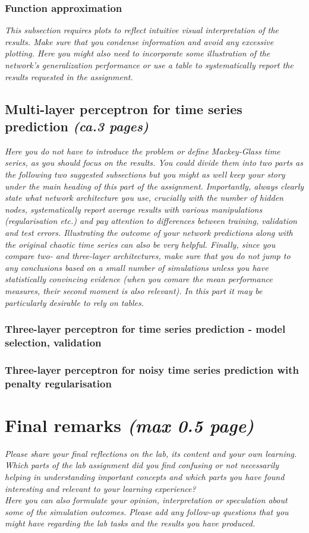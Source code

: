 \documentclass[a4paper]{article}
\begin{document}
\subsubsection{Function approximation}
\textit{This subsection requires plots to reflect intuitive visual interpretation of the results. Make sure that you condense information and avoid any excessive plotting. Here you might also need to incorporate some illustration of the network's generalization performance or use a table to systematically report the results requested in the assignment.}

\subsection{Multi-layer perceptron for time series prediction \textit{(ca.3 pages)}}

\textit{Here you do not have to introduce the problem or define Mackey-Glass time series, as you should focus on the results. You could divide them into two parts as the following two suggested subsections but you might as well keep your story under the main heading of this part of the assignment. Importantly, always clearly state what network architecture you use, crucially with the number of hidden nodes, systematically report average results with various manipulations (regularisation etc.) and pay attention to differences between training, validation and test errors. Illustrating the outcome of your network predictions along with the original chaotic time series can also be very helpful. Finally, since you compare two- and three-layer architectures, make sure that you do not jump to any conclusions based on a small number of simulations unless you have statistically convincing evidence (when you comare the mean performance measures, their second moment is also relevant). In this part it may be particularly desirable to rely on tables.}

\subsubsection{Three-layer perceptron for time series prediction - model selection, validation}

\subsubsection{Three-layer perceptron for noisy time series prediction with penalty regularisation}

\section{Final remarks \normalsize{\textit{(max 0.5 page)}}}
\textit{Please share your final reflections on the lab, its content and your own learning. Which parts of the lab assignment did you find confusing or not necessarily helping in understanding important concepts and which parts you have found interesting and relevant to your learning experience? \\
Here you can also formulate your opinion, interpretation or speculation about some of the simulation outcomes. Please add any follow-up questions that you might have regarding the lab tasks and the results you have produced.}
\end{document}
